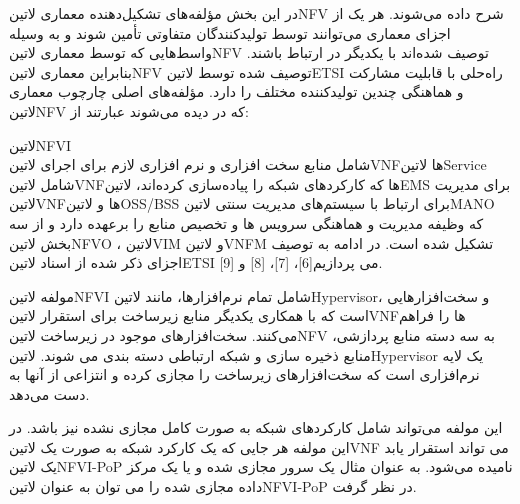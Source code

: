 \documentclass{book}
\begin{document}

در این بخش مؤلفه‌های تشکیل‌دهنده معماری ‌لاتین{NFV} شرح داده می‌شوند.
هر یک از اجزای معماری می‌توانند توسط تولیدکنندگان متفاوتی تأمین شوند و به وسیله واسط‌هایی که توسط معماری ‌لاتین{NFV} توصیف شده‌اند
با یکدیگر در ارتباط باشند.
بنابراین معماری ‌لاتین{NFV} توصیف شده توسط ‌لاتین{ETSI} راه‌حلی با قابلیت مشارکت و هماهنگی چندین تولیدکننده مختلف را دارد.
مؤلفه‌های اصلی چارچوب معماری ‌لاتین{NFV} که در  دیده می‌شوند عبارتند از:

 ‌لاتین{NFVI}\\ شامل منابع سخت افزاری و نرم افزاری لازم برای اجرای ‌لاتین{VNF}ها
 ‌لاتین{Service}\\ شامل ‌لاتین{VNF}ها که کارکردهای شبکه را پیاده‌سازی کرده‌اند، ‌لاتین{EMS} برای مدیریت ‌لاتین{VNF}ها و ‌لاتین{OSS/BSS} برای ارتباط با سیستم‌های مدیریت سنتی
 ‌لاتین{MANO}\\ که وظیفه مدیریت و هماهنگی سرویس ها و تخصیص منابع را برعهده دارد و از سه بخش
‌لاتین{NFVO}
، ‌لاتین{VIM}
و ‌لاتین{VNFM}
تشکیل شده است.
در ادامه به توصیف اجزای ذکر شده از اسناد ‌لاتین{ETSI} می پردازیم[6]، [7]، [8] و [9].

مولفه ‌لاتین{NFVI} شامل تمام نرم‌افزارها، مانند ‌لاتین{Hypervisor}، و سخت‌افزارهایی است که با همکاری یکدیگر منابع زیرساخت برای استقرار ‌لاتین{VNF}ها را فراهم می‌کنند.
سخت‌افزارهای موجود در زیرساخت ‌لاتین{NFV} به سه دسته منابع پردازشی، منابع ذخیره سازی و شبکه ارتباطی دسته بندی می شوند.
‌لاتین{Hypervisor} یک لایه نرم‌افزاری است که سخت‌افزارهای زیرساخت را مجازی کرده و انتزاعی از آن‍ها به دست می‌دهد.

این مولفه می‌تواند شامل کارکردهای شبکه به صورت کامل مجازی نشده نیز باشد.
در این مولفه هر جایی که یک کارکرد شبکه به صورت یک ‌لاتین{VNF} می تواند استقرار یابد یک ‌لاتین{NFVI-PoP} نامیده می‌شود.
به عنوان مثال یک سرور مجازی شده و یا یک مرکز داده مجازی شده را می توان به عنوان ‌لاتین{NFVI-PoP} در نظر گرفت.

\end{document}
